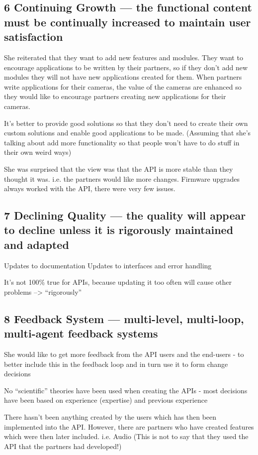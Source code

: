 \documentclass[conference]{IEEEtran}
\begin{document}
\subsection{6 Continuing Growth — the functional content must be continually increased to maintain user satisfaction}


She reiterated that they want to add new features and modules. They want to encourage applications to be written by their partners, so if they don’t add new modules they will not have new applications created for them. When partners write applications for their cameras, the value of the cameras are enhanced so they would like to encourage partners creating new applications for their cameras.

It’s better to provide good solutions so that they don’t need to create their own custom solutions and enable good applications to be made. (Assuming that she's talking about add more functionality so that people won't have to do stuff in their own weird ways)

She was surprised that the view was that the API is more stable than they thought it was. i.e. the partners would like more changes. Firmware upgrades always worked with the API, there were very few issues.

\subsection{7 Declining Quality — the quality will appear to decline unless it is rigorously maintained and adapted}
Updates to documentation
Updates to interfaces and error handling

It's not 100\% true for APIs, because updating it too often will cause other problems --> ``rigorously''

\subsection{8 Feedback System — multi-level, multi-loop, multi-agent feedback systems}
She would like to get more feedback from the API users and the end-users - to better include this in the feedback loop and in turn use it to form change decisions

No “scientific” theories have been used when creating the APIs - most decisions have been based on experience (expertise) and previous experience

There hasn’t been anything created by the users which has then been implemented into the API. However, there are partners who have created features which were then later included. i.e. Audio (This is not to say that they used the API that the partners had developed!)
\end{document}
